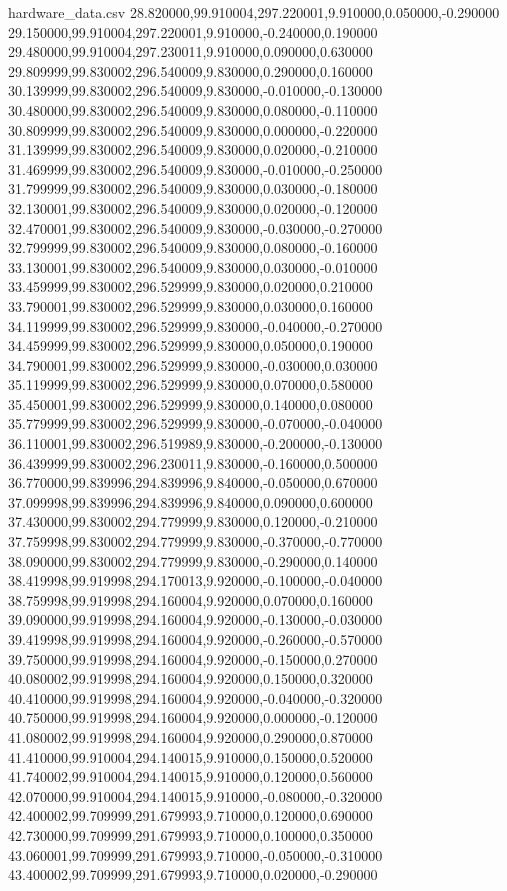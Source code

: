 \begin{filecontents}{hardware_data.csv}
28.820000,99.910004,297.220001,9.910000,0.050000,-0.290000
29.150000,99.910004,297.220001,9.910000,-0.240000,0.190000
29.480000,99.910004,297.230011,9.910000,0.090000,0.630000
29.809999,99.830002,296.540009,9.830000,0.290000,0.160000
30.139999,99.830002,296.540009,9.830000,-0.010000,-0.130000
30.480000,99.830002,296.540009,9.830000,0.080000,-0.110000
30.809999,99.830002,296.540009,9.830000,0.000000,-0.220000
31.139999,99.830002,296.540009,9.830000,0.020000,-0.210000
31.469999,99.830002,296.540009,9.830000,-0.010000,-0.250000
31.799999,99.830002,296.540009,9.830000,0.030000,-0.180000
32.130001,99.830002,296.540009,9.830000,0.020000,-0.120000
32.470001,99.830002,296.540009,9.830000,-0.030000,-0.270000
32.799999,99.830002,296.540009,9.830000,0.080000,-0.160000
33.130001,99.830002,296.540009,9.830000,0.030000,-0.010000
33.459999,99.830002,296.529999,9.830000,0.020000,0.210000
33.790001,99.830002,296.529999,9.830000,0.030000,0.160000
34.119999,99.830002,296.529999,9.830000,-0.040000,-0.270000
34.459999,99.830002,296.529999,9.830000,0.050000,0.190000
34.790001,99.830002,296.529999,9.830000,-0.030000,0.030000
35.119999,99.830002,296.529999,9.830000,0.070000,0.580000
35.450001,99.830002,296.529999,9.830000,0.140000,0.080000
35.779999,99.830002,296.529999,9.830000,-0.070000,-0.040000
36.110001,99.830002,296.519989,9.830000,-0.200000,-0.130000
36.439999,99.830002,296.230011,9.830000,-0.160000,0.500000
36.770000,99.839996,294.839996,9.840000,-0.050000,0.670000
37.099998,99.839996,294.839996,9.840000,0.090000,0.600000
37.430000,99.830002,294.779999,9.830000,0.120000,-0.210000
37.759998,99.830002,294.779999,9.830000,-0.370000,-0.770000
38.090000,99.830002,294.779999,9.830000,-0.290000,0.140000
38.419998,99.919998,294.170013,9.920000,-0.100000,-0.040000
38.759998,99.919998,294.160004,9.920000,0.070000,0.160000
39.090000,99.919998,294.160004,9.920000,-0.130000,-0.030000
39.419998,99.919998,294.160004,9.920000,-0.260000,-0.570000
39.750000,99.919998,294.160004,9.920000,-0.150000,0.270000
40.080002,99.919998,294.160004,9.920000,0.150000,0.320000
40.410000,99.919998,294.160004,9.920000,-0.040000,-0.320000
40.750000,99.919998,294.160004,9.920000,0.000000,-0.120000
41.080002,99.919998,294.160004,9.920000,0.290000,0.870000
41.410000,99.910004,294.140015,9.910000,0.150000,0.520000
41.740002,99.910004,294.140015,9.910000,0.120000,0.560000
42.070000,99.910004,294.140015,9.910000,-0.080000,-0.320000
42.400002,99.709999,291.679993,9.710000,0.120000,0.690000
42.730000,99.709999,291.679993,9.710000,0.100000,0.350000
43.060001,99.709999,291.679993,9.710000,-0.050000,-0.310000
43.400002,99.709999,291.679993,9.710000,0.020000,-0.290000

\end{filecontents}

